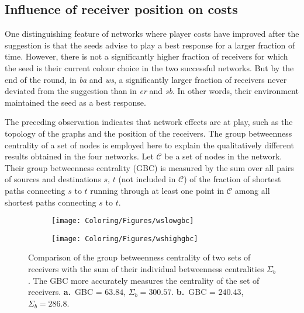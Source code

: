 
\subsection{Influence of receiver position on costs}
\newcommand{\gbcns}{\mathcal{C}}

One distinguishing feature of networks where player costs have improved after the suggestion is that the seeds advise to play a best response for a larger fraction of time. However, there is not a significantly higher fraction of receivers for which the seed is their current colour choice in the two successful networks. But by the end of the round, in \textit{ba} and \textit{ws}, a significantly larger fraction of receivers never deviated from the suggestion than in \textit{er} and \textit{sb}. In other words, their environment maintained the seed as a best response.

The preceding observation indicates that network effects are at play, such as the topology of the graphs and the position of the receivers.
The group betweenness centrality \citep{everett_centrality_1999} of a set of nodes is employed here to explain the qualitatively different results obtained in the four networks. Let \( \gbcns \) be a set of nodes in the network. Their group betweenness centrality (GBC) is measured by the sum over all pairs of sources and destinations \( s, \, t \) (not included in \( \gbcns \)) of the fraction of shortest paths connecting \( s \) to \( t \) running through at least one point in \( \gbcns \) among all shortest paths connecting \( s \) to \( t \).

\begin{figure}
  \centering
	\begin{subfigure}[t]{0.45\linewidth}
    \centering
	  \texttt{[image: Coloring/Figures/wslowgbc]}
    \caption{}
  \end{subfigure}
	\hfill
  \begin{subfigure}[t]{0.45\linewidth}
    \centering
  	\texttt{[image: Coloring/Figures/wshighgbc]}
    \caption{}
  \end{subfigure}
  \caption{Comparison of the group betweenness centrality of two sets of receivers with the sum of their individual betweenness centralities \( \Sigma_b \). The GBC more accurately measures the centrality of the set of receivers.
	\textbf{a.}~GBC = \( 63.84 \), \( \Sigma_b = 300.57 \).
	\textbf{b.}~GBC = \( 240.43 \), \( \Sigma_b = 286.8 \).}
  \label{fig:gbccomp}
\end{figure}

